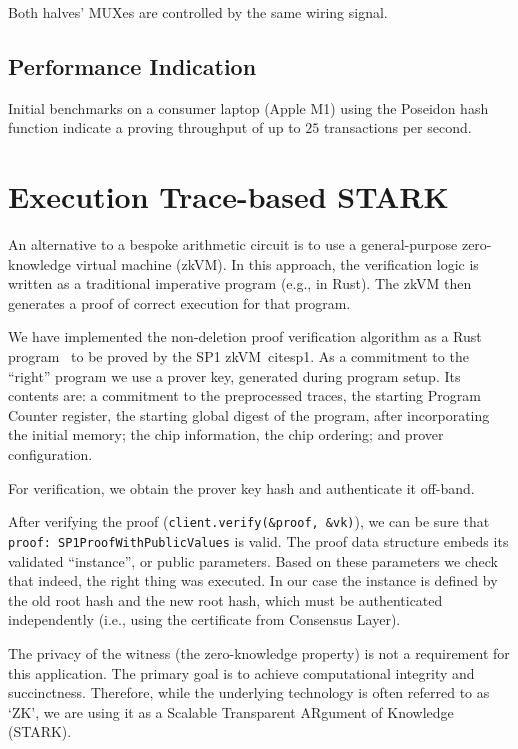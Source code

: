 \documentclass[twocolumn]{article}
\begin{document}
Both halves' MUXes are controlled by the same wiring signal.

\subsection{Performance Indication}

Initial benchmarks on a consumer laptop (Apple M1) using the Poseidon hash function indicate a proving throughput of up to $25$ transactions per second.


\section{Execution Trace-based STARK}

An alternative to a bespoke arithmetic circuit is to use a general-purpose zero-knowledge virtual machine (zkVM). In this approach, the verification logic is written as a traditional imperative program (e.g., in Rust). The zkVM then generates a proof of correct execution for that program.

We have implemented the non-deletion proof verification algorithm as a Rust program~\cite{stark} to be proved by the SP1 zkVM~cite{sp1}. As a commitment to the ``right'' program we use a prover key, generated during program setup. Its contents are: a commitment to the preprocessed traces, the starting Program Counter register, the starting global digest of the program, after incorporating the initial memory; the chip information, the chip ordering; and prover configuration.

For verification, we obtain the prover key hash and authenticate it off-band.

After verifying the proof (\lstinline|client.verify(&proof, &vk)|), we can be sure that \lstinline|proof: SP1ProofWithPublicValues| is valid. The proof data structure embeds its validated ``instance'', or public parameters. Based on these parameters we check that indeed, the right thing was executed. In our case the instance is defined by the old root hash and the new root hash, which must be authenticated independently (i.e., using the certificate from Consensus Layer).

The privacy of the witness (the zero-knowledge property) is not a requirement for this application. The primary goal is to achieve computational integrity and succinctness. Therefore, while the underlying technology is often referred to as `ZK', we are using it as a Scalable Transparent ARgument of Knowledge (STARK).
\end{document}
